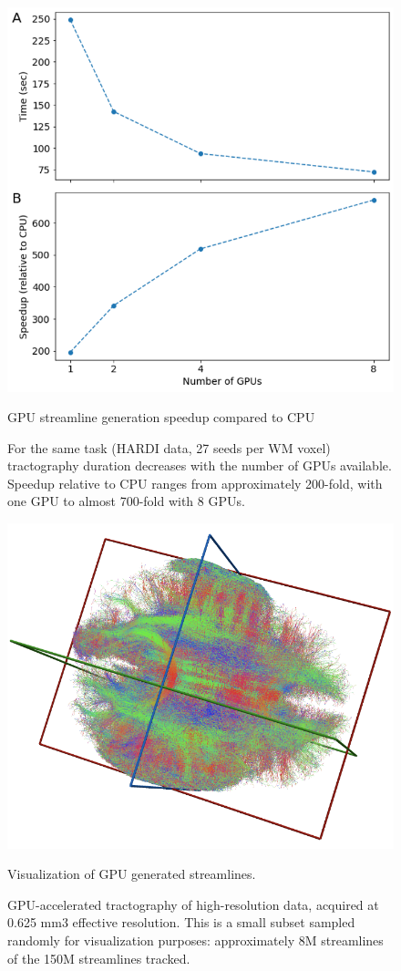 \begin{figure}[htbp]
    \centering
    \includegraphics[width=\textwidth]{../figures/chapter2/speedup.png}
    \caption{GPU streamline generation speedup compared to CPU}
    \caption*{For the same task (HARDI data, 27 seeds per WM voxel) tractography duration decreases with the number of GPUs available. Speedup relative to CPU ranges from approximately 200-fold, with one GPU to almost 700-fold with 8 GPUs.}
    \label{fig:gpu_speedup}
\end{figure}

\begin{figure}[htbp]
	\centering
	\includegraphics[width=\textwidth]{../figures/chapter2/streamlines.png}
	\caption{Visualization of GPU generated streamlines.}
	\caption*{GPU-accelerated tractography of high-resolution data, acquired at 0.625 mm3  effective resolution. This is a small subset sampled randomly for visualization purposes: approximately 8M streamlines of the 150M streamlines tracked.}
	\label{fig:gpu_streamlines}
\end{figure}

